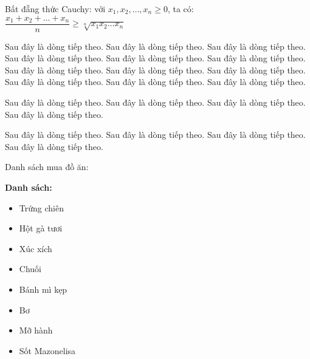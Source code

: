 \documentclass[12pt,a4paper]{article}
\newenvironment{danhsach}
    {\textbf{Danh sách:}
    \begin{minipage}[t]{0.8\linewidth}
    \begin{itemize}}
    {\end{itemize}\end{minipage}}
\begin{document}
	Bất đẵng thức Cauchy: với $x_1,x_2,\ldots,x_n\geq 0$, ta có: $\dfrac{x_1+x_2+\ldots+x_n}{n}\geq\sqrt[n]{x_1 x_2\ldots x_n}$
	
	Sau đây là dòng tiếp theo. Sau đây là dòng tiếp theo. Sau đây là dòng tiếp theo. Sau đây là dòng tiếp theo. Sau đây là dòng tiếp theo. Sau đây là dòng tiếp theo. Sau đây là dòng tiếp theo. Sau đây là dòng tiếp theo. Sau đây là dòng tiếp theo. Sau đây là dòng tiếp theo. Sau đây là dòng tiếp theo. Sau đây là dòng tiếp theo.
	
	Sau đây là dòng tiếp theo. Sau đây là dòng tiếp theo. Sau đây là dòng tiếp theo. Sau đây là dòng tiếp theo.
	
	Sau đây là dòng tiếp theo. Sau đây là dòng tiếp theo. Sau đây là dòng tiếp theo. Sau đây là dòng tiếp theo.
	
	Danh sách mua đồ ăn:
	\renewcommand{\labelitemi}{$-$}
	
	\begin{danhsach}
		\item Trứng chiên
		\item Hột gà tươi
		\item Xúc xích
		\item Chuối
		\item Bánh mì kẹp
		\item Bơ
		\item Mỡ hành
		\item Sốt Mazonelisa
	\end{danhsach}
\end{document}
